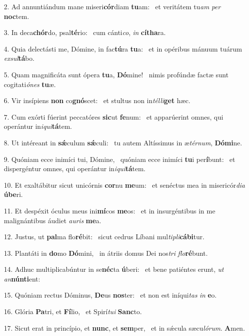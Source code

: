 2. Ad annuntiándum mane miseri\textbf{cór}diam \textbf{tu}am: \ast\  et veritátem tu\textit{am} \textit{per} \textbf{noc}tem.\

3. In deca\textbf{chór}do, psal\textbf{té}rio: \ast\  cum cánti\textit{co}, \textit{in} \textbf{cí}\textbf{tha}ra.\

4. Quia delectásti me, Dómine, in fac\textbf{tú}ra \textbf{tu}a: \ast\  et in opéribus mánuum tuárum \textit{ex}\textit{sul}\textbf{tá}bo.\

5. Quam magnificáta sunt ópera \textbf{tu}a, \textbf{Dó}mine! \ast\  nimis profúndæ factæ sunt cogitati\textit{ó}\textit{nes} \textbf{tu}æ.\

6. Vir insípiens \textbf{non} co\textbf{gnó}scet: \ast\  et stultus non in\textit{tél}\textit{li}\textbf{get} hæc.\

7. Cum exórti fúerint peccatóres \textbf{sic}ut \textbf{fe}num: \ast\  et apparúerint omnes, qui operántur in\textit{i}\textit{qui}\textbf{tá}tem.\

8. Ut intéreant in \textbf{sǽ}culum \textbf{sǽ}culi: \ast\  tu autem Altíssimus in æ\textit{tér}\textit{num}, \textbf{Dó}\textbf{mi}ne.\

9. Quóniam ecce inimíci tui, Dómine, \dag\  quóniam ecce inimíci \textbf{tu}i per\textbf{í}bunt: \ast\  et dispergéntur omnes, qui operántur in\textit{i}\textit{qui}\textbf{tá}tem.\

10. Et exaltábitur sicut unicórnis \textbf{cor}nu \textbf{me}um: \ast\  et senéctus mea in misericór\textit{di}\textit{a} \textbf{ú}\textbf{be}ri.\

11. Et despéxit óculus meus ini\textbf{mí}cos \textbf{me}os: \ast\  et in insurgéntibus in me malignántibus áudiet \textit{au}\textit{ris} \textbf{me}a.\

12. Justus, ut \textbf{pal}ma flo\textbf{ré}bit: \ast\  sicut cedrus Líbani mul\textit{ti}\textit{pli}\textbf{cá}\textbf{bi}tur.\

13. Plantáti in \textbf{do}mo \textbf{Dó}mini, \ast\  in átriis domus Dei nos\textit{tri} \textit{flo}\textbf{ré}bunt.\

14. Adhuc multiplicabúntur in se\textbf{néc}ta \textbf{ú}beri: \ast\  et bene patiéntes erunt, \textit{ut} \textit{an}\textbf{nún}\textbf{ti}ent:\

15. Quóniam rectus Dóminus, \textbf{De}us \textbf{nos}ter: \ast\  et non est iníqui\textit{tas} \textit{in} \textbf{e}o.\

16. Glória \textbf{Pa}tri, et \textbf{Fí}lio, \ast\  et Spirí\textit{tu}\textit{i} \textbf{Sanc}to.\

17. Sicut erat in princípio, et \textbf{nunc}, et \textbf{sem}per, \ast\  et in sǽcula sæcu\textit{ló}\textit{rum}. \textbf{A}men.\

